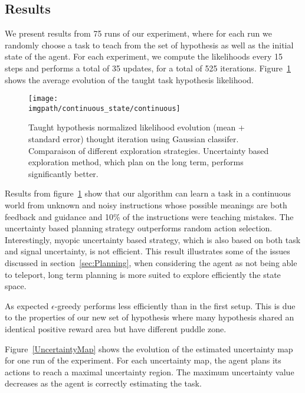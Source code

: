 \subsection{Results}

We present results from 75 runs of our experiment, where for each run we randomly choose a task to teach from the set of hypothesis as well as the initial state of the agent. For each experiment, we compute the likelihoods every 15 steps and performs a total of 35 updates, for a total of 525 iterations. Figure~\ref{Rmax} shows the average evolution of the taught task hypothesis likelihood.

\begin{figure}[!htbp]
  \centering
  \texttt{[image: \\imgpath/continuous\_state/continuous]}
  \caption{Taught hypothesis normalized likelihood evolution (mean + standard error) thought iteration using Gaussian classifer. Comparaison of different exploration strategies. Uncertainty based exploration method, which plan on the long term, performs significantly better.}
  \label{Rmax}
\end{figure}

Results from figure~\ref{Rmax} show that our algorithm can learn a task in a continuous world from unknown and noisy instructions whose possible meanings are both feedback and guidance and 10\% of the instructions were teaching mistakes. The uncertainty based planning strategy outperforms random action selection. Interestingly, myopic uncertainty based strategy, which is also based on both task and signal uncertainty, is not efficient. This result illustrates some of the issues discussed in section~\ref{sec:Planning}, when considering the agent as not being able to teleport, long term planning is more suited to explore efficiently the state space. 

As expected $\epsilon$-greedy performs less efficiently than in the first setup. This is due to the properties of our new set of hypothesis where many hypothesis shared an identical positive reward area but have different puddle zone.

Figure~\ref{UncertaintyMap} shows the evolution of the estimated uncertainty map for one run of the experiment. For each uncertainty map, the agent plans its actions to reach a maximal uncertainty region. The maximum uncertainty value decreases as the agent is correctly estimating the task.

